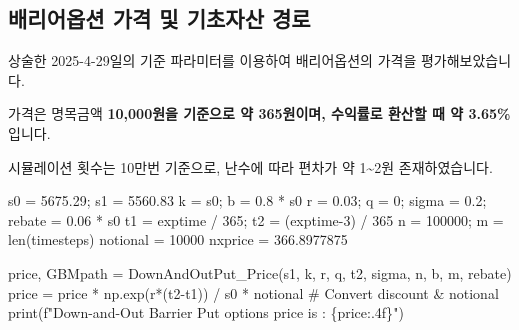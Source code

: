 \documentclass[
  a4paper,
  DIV=11,
  numbers=noendperiod]{scrreprt}
\newenvironment{Shaded}{\begin{snugshade}}{\end{snugshade}}
\newcommand{\BuiltInTok}[1]{\textcolor[rgb]{0.00,0.23,0.31}{#1}}
\newcommand{\CommentTok}[1]{\textcolor[rgb]{0.37,0.37,0.37}{#1}}
\newcommand{\DecValTok}[1]{\textcolor[rgb]{0.68,0.00,0.00}{#1}}
\newcommand{\FloatTok}[1]{\textcolor[rgb]{0.68,0.00,0.00}{#1}}
\newcommand{\NormalTok}[1]{\textcolor[rgb]{0.00,0.23,0.31}{#1}}
\newcommand{\OperatorTok}[1]{\textcolor[rgb]{0.37,0.37,0.37}{#1}}
\newcommand{\SpecialCharTok}[1]{\textcolor[rgb]{0.37,0.37,0.37}{#1}}
\newcommand{\SpecialStringTok}[1]{\textcolor[rgb]{0.13,0.47,0.30}{#1}}
\begin{document}

\subsection*{배리어옵션 가격 및 기초자산
경로}\label{uxbc30uxb9acuxc5b4uxc635uxc158-uxac00uxaca9-uxbc0f-uxae30uxcd08uxc790uxc0b0-uxacbduxb85c}

상술한 2025-4-29일의 기준 파라미터를 이용하여 배리어옵션의 가격을
평가해보았습니다.

가격은 명목금액 \textbf{10,000원을 기준으로 약 365원이며, 수익률로
환산할 때 약 3.65\%}입니다.

시뮬레이션 횟수는 10만번 기준으로, 난수에 따라 편차가 약
1\textasciitilde2원 존재하였습니다.

\begin{Shaded}
\begin{Highlighting}[]
\NormalTok{s0 }\OperatorTok{=} \FloatTok{5675.29}\OperatorTok{;}\NormalTok{ s1 }\OperatorTok{=} \FloatTok{5560.83}
\NormalTok{k }\OperatorTok{=}\NormalTok{ s0}\OperatorTok{;}\NormalTok{ b }\OperatorTok{=} \FloatTok{0.8} \OperatorTok{*}\NormalTok{ s0}
\NormalTok{r }\OperatorTok{=} \FloatTok{0.03}\OperatorTok{;}\NormalTok{ q }\OperatorTok{=} \DecValTok{0}\OperatorTok{;}\NormalTok{ sigma }\OperatorTok{=} \FloatTok{0.2}\OperatorTok{;}\NormalTok{ rebate }\OperatorTok{=} \FloatTok{0.06} \OperatorTok{*}\NormalTok{ s0}
\NormalTok{t1 }\OperatorTok{=}\NormalTok{ exptime }\OperatorTok{/} \DecValTok{365}\OperatorTok{;}\NormalTok{ t2 }\OperatorTok{=}\NormalTok{ (exptime}\OperatorTok{{-}}\DecValTok{3}\NormalTok{) }\OperatorTok{/} \DecValTok{365}
\NormalTok{n }\OperatorTok{=} \DecValTok{100000}\OperatorTok{;}\NormalTok{ m }\OperatorTok{=} \BuiltInTok{len}\NormalTok{(timesteps)}
\NormalTok{notional }\OperatorTok{=} \DecValTok{10000}
\NormalTok{nxprice }\OperatorTok{=} \FloatTok{366.8977875}

\NormalTok{price, GBMpath }\OperatorTok{=}\NormalTok{ DownAndOutPut\_Price(s1, k, r, q, t2, sigma, n, b, m, rebate)}
\NormalTok{price }\OperatorTok{=}\NormalTok{ price }\OperatorTok{*}\NormalTok{ np.exp(r}\OperatorTok{*}\NormalTok{(t2}\OperatorTok{{-}}\NormalTok{t1)) }\OperatorTok{/}\NormalTok{ s0 }\OperatorTok{*}\NormalTok{ notional }\CommentTok{\# Convert discount \& notional}
\BuiltInTok{print}\NormalTok{(}\SpecialStringTok{f"Down{-}and{-}Out Barrier Put options price is : }\SpecialCharTok{\{}\NormalTok{price}\SpecialCharTok{:.4f\}}\SpecialStringTok{"}\NormalTok{)}
\end{Highlighting}
\end{Shaded}
\end{document}
